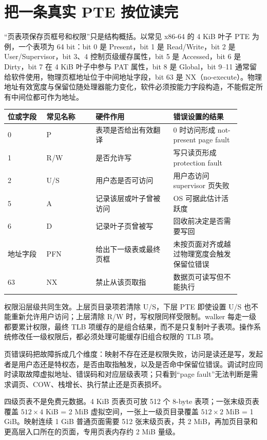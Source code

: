 \section{把一条真实 PTE 按位读完}

“页表项保存页框号和权限”只是结构概括。以常见 x86-64 的 4 KiB 叶子 PTE 为例，一个表项为 64 bit：bit 0 是 Present，bit 1 是 Read/Write，bit 2 是 User/Supervisor，bit 3、4 控制页级缓存属性，bit 5 是 Accessed，bit 6 是 Dirty，bit 7 在 4 KiB 叶子中参与 PAT 属性，bit 8 是 Global，bit 9--11 通常留给软件使用，物理页框地址位于中间地址字段，bit 63 是 NX（no-execute）。物理地址有效宽度与保留位随处理器能力变化，软件必须按能力字段构造，不能假定所有中间位都可作为地址。

\begin{longtable}{L{0.15\linewidth}L{0.19\linewidth}L{0.30\linewidth}L{0.26\linewidth}}
\toprule
位或字段 & 常见名称 & 硬件作用 & 错误设置的结果 \\
 & P & 表项是否给出有效翻译 & 0 时访问形成 not-present page fault \\
1 & R/W & 是否允许写 & 写只读页形成 protection fault \\
2 & U/S & 用户态是否可访问 & 用户态访问 supervisor 页失败 \\
5 & A & 记录该层或叶子曾被访问 & OS 可据此估计活跃度 \\
6 & D & 记录叶子页曾被写 & 回收前决定是否需要写回 \\
地址字段 & PFN & 给出下一级表或最终页框 & 未按页面对齐或越过物理宽度会触发保留位错误 \\
63 & NX & 禁止从该页取指 & 数据页可读写但不能执行 \\
\bottomrule
\end{longtable}

权限沿层级共同生效。上层页目录项若清除 U/S，下层 PTE 即使设置 U/S 也不能重新允许用户访问；上层清除 R/W 时，写权限同样受限制。walker 每走一级都要累计权限，最终 TLB 项缓存的是组合结果，而不是只复制叶子表项。操作系统修改任一级权限后，都必须处理可能缓存旧组合权限的 TLB 项。

页错误码把故障拆成几个维度：映射不存在还是权限失败，访问是读还是写，发起者是用户态还是特权态，是否由取指触发，以及是否命中保留位错误。调试时应同时读取故障虚拟地址、错误码和对应层级表项；只看到“page fault”无法判断是需求调页、COW、栈增长、执行禁止还是页表损坏。


四级页表不是免费元数据。4 KiB 页表页可放 512 个 8-byte 表项；一张末级页表覆盖 $512\times4$ KiB = 2 MiB 虚拟空间，一张上一级页目录覆盖 $512\times2$ MiB = 1 GiB。映射连续 1 GiB 普通页面需要 512 张末级页表，共 2 MiB，再加页目录和更高层入口所在的页面，专用页表内存约 2 MiB 量级。

